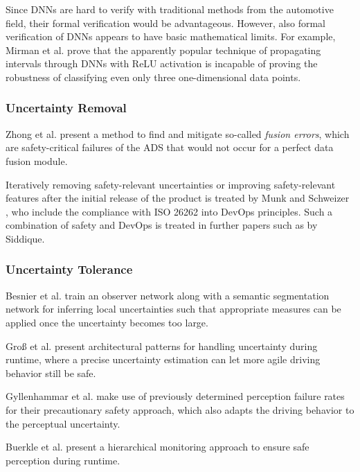\documentclass[conference]{IEEEtran}
\begin{document}
Since DNNs are hard to verify with traditional methods from the automotive field, their formal verification would be advantageous. 
However, also formal verification of DNNs appears to have basic mathematical limits. 
For example, Mirman et al. \cite{Mirman2021limits} prove that the apparently popular technique of propagating intervals through DNNs with ReLU activation is incapable of proving the robustness of classifying even only three one-dimensional data points.

\subsubsection{Uncertainty Removal}
\label{sec:uncertainty_removal}

Zhong et al. \cite{Zhong2021detecting} present a method to find and mitigate so-called \textit{fusion errors}, which are safety-critical failures of the ADS that would not occur for a perfect data fusion module.

Iteratively removing safety-relevant uncertainties or improving safety-relevant features after the initial release of the product is treated by Munk and Schweizer \cite{Munk2022safeops}, who include the compliance with ISO 26262 into DevOps principles.
Such a combination of safety and DevOps is treated in further papers such as \cite{Siddique2020} by Siddique.


\subsubsection{Uncertainty Tolerance}
\label{sec:uncertainty_tolerance}

Besnier et al. \cite{Besnier2021uncertainty} train an observer network along with a semantic segmentation network for inferring local uncertainties such that appropriate measures can be applied once the uncertainty becomes too large.

Groß et al. \cite{Gross2022architectural} present architectural patterns for handling uncertainty during runtime, where a precise uncertainty estimation can let more agile driving behavior still be safe.

Gyllenhammar et al. \cite{Gyllenhammar2022uncertainty} make use of previously determined perception failure rates for their precautionary safety approach, which also adapts the driving behavior to the perceptual uncertainty. 

Buerkle et al. \cite{Buerkle2022safe} present a hierarchical monitoring approach to ensure safe perception during runtime.
\end{document}
